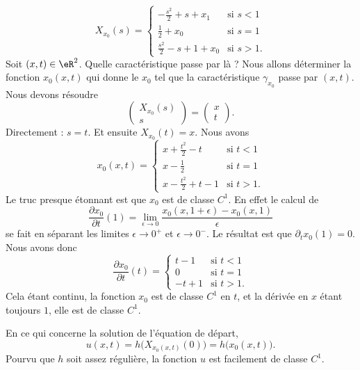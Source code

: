 \begin{example}
	\begin{equation}
		X_{x_0}(s)=\begin{cases}
			-\frac{ s^2 }{2}+s+x_1  & \text{si }  s<1 \\
			\frac{ 1 }{2}+x_0       & \text{si } s=1  \\
			\frac{ s^2 }{2}-s+1+x_0 & \text{si } s>1.
		\end{cases}
	\end{equation}
	Soit \( (x,t)\in \eR^2\). Quelle caractéristique passe par là ? Nous allons déterminer la fonction \( x_0(x,t)\) qui donne le \( x_0\) tel que la caractéristique \( \gamma_{x_0}\) passe par \( (x,t)\). Nous devons résoudre
	\begin{equation}
		\begin{pmatrix}
			X_{x_0}(s) \\
			s
		\end{pmatrix}=\begin{pmatrix}
			x \\
			t
		\end{pmatrix}.
	\end{equation}
	Directement : \( s=t\). Et ensuite \( X_{x_0}(t)=x\). Nous avons
	\begin{equation}
		x_0(x,t)=\begin{cases}
			x+\frac{ t^2 }{2}-t   & \text{si } t<1  \\
			x-\frac{ 1 }{2}       & \text{si } t=1  \\
			x-\frac{ t^2 }{2}+t-1 & \text{si } t>1.
		\end{cases}
	\end{equation}
	Le truc presque étonnant est que \( x_0\) est de classe \( C^1\). En effet le calcul de
	\begin{equation}
		\frac{ \partial x_0 }{ \partial t }(1)=\lim_{\epsilon\to 0}\frac{ x_0(x,1+\epsilon)-x_0(x,1) }{ \epsilon }
	\end{equation}
	se fait en séparant les limites \( \epsilon\to 0^+\) et \( \epsilon\to 0^-\). Le résultat est que \( \partial_tx_0(1)=0\). Nous avons donc
	\begin{equation}
		\frac{ \partial x_0 }{ \partial t }(t)=\begin{cases}
			t-1  & \text{si } t<1 \\
			0    & \text{si } t=1 \\
			-t+1 & \text{si }t>1.
		\end{cases}
	\end{equation}
	Cela étant continu, la fonction \( x_0\) est de classe \( C^1\) en \( t\), et la dérivée en \( x\) étant toujours \( 1\), elle est de classe \( C^1\).

	En ce qui concerne la solution de l'équation de départ,
	\begin{equation}
		u(x,t)=h\big( X_{x_0(x,t)}(0) \big)=h\big( x_0(x,t) \big).
	\end{equation}
	Pourvu que \( h\) soit assez régulière, la fonction \( u\) est facilement de classe \( C^1\).
\end{example}

